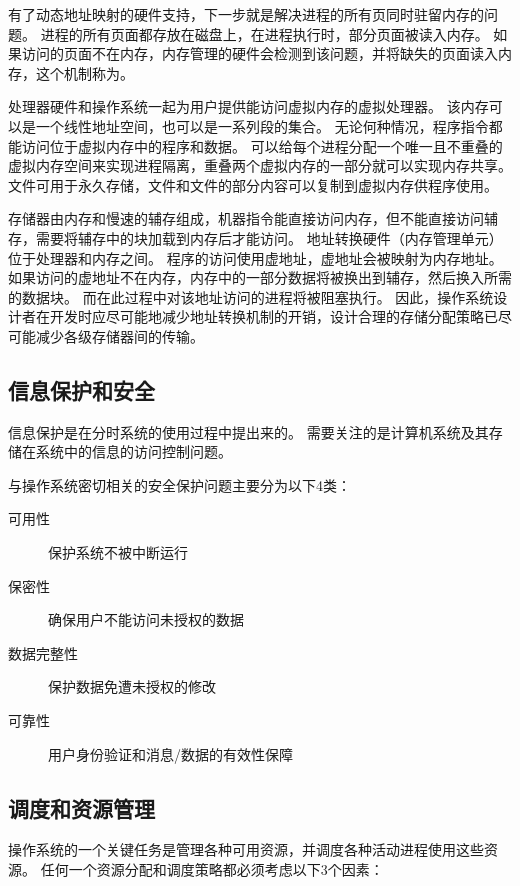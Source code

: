 {{        有了动态地址映射的硬件支持，下一步就是解决进程的所有页同时驻留内存的问题。
        进程的所有页面都存放在磁盘上，在进程执行时，部分页面被读入内存。
        如果访问的页面不在内存，内存管理的硬件会检测到该问题，并将缺失的页面读入内存，这个机制称为。

        处理器硬件和操作系统一起为用户提供能访问虚拟内存的虚拟处理器。
        该内存可以是一个线性地址空间，也可以是一系列段的集合。
        无论何种情况，程序指令都能访问位于虚拟内存中的程序和数据。
        可以给每个进程分配一个唯一且不重叠的虚拟内存空间来实现进程隔离，重叠两个虚拟内存的一部分就可以实现内存共享。
        文件可用于永久存储，文件和文件的部分内容可以复制到虚拟内存供程序使用。

        存储器由内存和慢速的辅存组成，机器指令能直接访问内存，但不能直接访问辅存，需要将辅存中的块加载到内存后才能访问。
        地址转换硬件（内存管理单元）位于处理器和内存之间。
        程序的访问使用虚地址，虚地址会被映射为内存地址。
        如果访问的虚地址不在内存，内存中的一部分数据将被换出到辅存，然后换入所需的数据块。
        而在此过程中对该地址访问的进程将被阻塞执行。
        因此，操作系统设计者在开发时应尽可能地减少地址转换机制的开销，设计合理的存储分配策略已尽可能减少各级存储器间的传输。
    }

    \subsection{信息保护和安全}
    {
        信息保护是在分时系统的使用过程中提出来的。
        需要关注的是计算机系统及其存储在系统中的信息的访问控制问题。

        与操作系统密切相关的安全保护问题主要分为以下4类：

        \begin{description}
            \item[可用性] 保护系统不被中断运行
            \item[保密性] 确保用户不能访问未授权的数据
            \item[数据完整性] 保护数据免遭未授权的修改
            \item[可靠性] 用户身份验证和消息/数据的有效性保障
        \end{description}
    }

    \subsection{调度和资源管理}
    {
        操作系统的一个关键任务是管理各种可用资源，并调度各种活动进程使用这些资源。
        任何一个资源分配和调度策略都必须考虑以下3个因素：

}}
